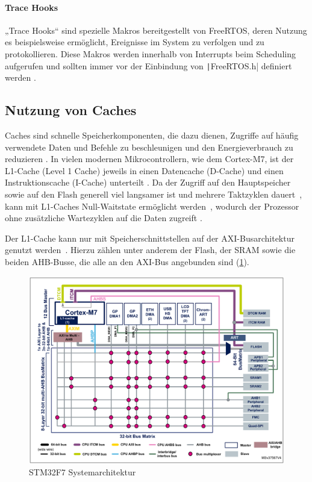 \paragraph{Trace Hooks} \label{sec:trace_hooks}

„Trace Hooks“ sind spezielle Makros bereitgestellt von FreeRTOS, deren Nutzung
es beispielsweise ermöglicht, Ereignisse im System zu verfolgen und zu
protokollieren. Diese Makros werden innerhalb von Interrupts beim Scheduling
aufgerufen und sollten immer vor der Einbindung von
\texttt|FreeRTOS.h| definiert werden \cite{freertos_rtos_trace_hooks}.

\subsection{Nutzung von Caches}

Caches sind schnelle Speicherkomponenten, die dazu dienen, Zugriffe auf häufig
verwendete Daten und Befehle zu beschleunigen und den Energieverbrauch zu
reduzieren \cite{ka001150}. In vielen modernen Mikrocontrollern, wie dem
Cortex-M7, ist der L1-Cache (Level 1 Cache) jeweils in einen Datencache
(D-Cache) und einen Instruktionscache (I-Cache) unterteilt \cite[S. 6]{an4667}.
Da der Zugriff auf den Hauptspeicher sowie auf den Flash generell viel langsamer
ist und mehrere Taktzyklen dauert~\cite{stm32_memory_sections}, kann mit
L1-Caches Null-Waitstate ermöglicht werden~\cite[S. 6]{an4667}, wodurch der
Prozessor ohne zusätzliche Wartezyklen auf die Daten zugreift
\cite{waitstate_wiki}.

Der L1-Cache kann nur mit Speicherschnittstellen auf der \ac{AXI}-Busarchitektur
genutzt werden~\cite[S. 4]{an4839}. Hierzu zählen unter anderem der Flash, der
\ac{SRAM} sowie die beiden \ac{AHB}-Busse, die alle an den AXI-Bus angebunden
sind (\ref{fig:m7_sys_arch}).

\begin{figure}[htb]
    \centering
    \includegraphics[width=1\textwidth]{assets/m7_system_arch}
    \caption{STM32F7 Systemarchitektur \cite[S. 9]{an4667}}
    \label{fig:m7_sys_arch}
\end{figure}

